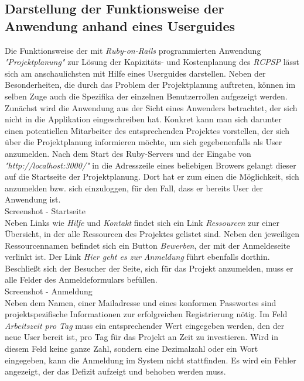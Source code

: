 \documentclass[a4paper,12pt,parskip,bibtotoc,liststotoc]{article}
\begin{document}
\subsection{Darstellung der Funktionsweise der Anwendung anhand eines Userguides}\label{User}
Die Funktionsweise der mit \textit{Ruby-on-Rails} programmierten Anwendung \textit {"Projektplanung"} zur Lösung der Kapizitäts- und Kostenplanung des \textit{RCPSP} lässt sich am anschaulichsten mit Hilfe eines Userguides darstellen. Neben der Besonderheiten, die durch das Problem der Projektplanung auftreten, können im selben Zuge auch die Spezifika der einzelnen Benutzerrollen aufgezeigt werden.\\
Zunächst wird die Anwendung aus der Sicht eines Anwenders betrachtet, der sich nicht in die Applikation eingeschreiben hat. Konkret kann man sich darunter einen potentiellen Mitarbeiter des entsprechenden Projektes vorstellen, der sich über die Projektplanung informieren möchte, um sich gegebenenfalls als User anzumelden. Nach dem Start des Ruby-Servers und der Eingabe von \textit {"http://localhost:3000/"} in die Adresszeile eines beliebigen Browers gelangt dieser auf die Startseite der Projektplanung. Dort hat er zum einen die Möglichkeit, sich anzumelden bzw. sich einzuloggen, für den Fall, dass er bereits User der Anwendung ist.\\

Screenshot - Startseite\\

Neben Links wie \textit{Hilfe} und \textit{Kontakt} findet sich ein Link \textit{Ressourcen} zur einer Übersicht, in der alle Ressourcen des Projektes gelistet sind. Neben den jeweiligen Ressourcennamen befindet sich ein Button \textit{Bewerben}, der mit der Anmeldeseite verlinkt ist. Der Link \textit{Hier geht es zur Anmeldung} führt ebenfalls dorthin. Beschließt sich der Besucher der Seite, sich für das Projekt anzumelden, muss er alle Felder des Anmeldeformulars befüllen.\\

Screenshot - Anmeldung\\

Neben dem Namen, einer Mailadresse und eines konformen Passwortes sind projektspezifische Informationen zur erfolgreichen Registrierung nötig. Im Feld \textit{Arbeitszeit pro Tag} muss ein entsprechender Wert eingegeben werden, den der neue User bereit ist, pro Tag für das Projekt an Zeit zu investieren. Wird in diesem Feld keine ganze Zahl, sondern eine Dezimalzahl oder ein Wort eingegeben, kann die Anmeldung im System nicht stattfinden. Es wird ein Fehler angezeigt, der das Defizit aufzeigt und behoben werden muss.\\
\end{document}
